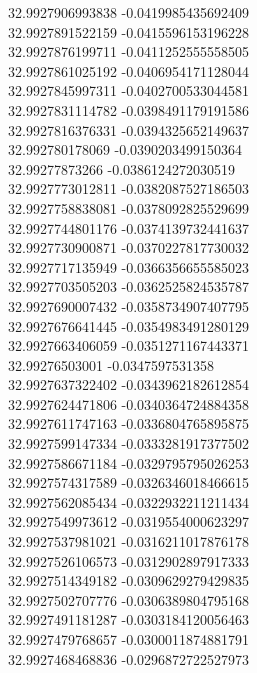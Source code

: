 {32.9927906993838	-0.0419985435692409\\
32.9927891522159	-0.0415596153196228\\
32.9927876199711	-0.0411252555558505\\
32.9927861025192	-0.0406954171128044\\
32.9927845997311	-0.0402700533044581\\
32.9927831114782	-0.0398491179191586\\
32.9927816376331	-0.0394325652149637\\
32.992780178069	-0.0390203499150364\\
32.99277873266	-0.0386124272030519\\
32.9927773012811	-0.0382087527186503\\
32.9927758838081	-0.0378092825529699\\
32.9927744801176	-0.0374139732441637\\
32.9927730900871	-0.0370227817730032\\
32.9927717135949	-0.0366356655585023\\
32.9927703505203	-0.0362525824535787\\
32.9927690007432	-0.0358734907407795\\
32.9927676641445	-0.0354983491280129\\
32.9927663406059	-0.0351271167443371\\
32.99276503001	-0.0347597531358\\
32.9927637322402	-0.0343962182612854\\
32.9927624471806	-0.0340364724884358\\
32.9927611747163	-0.0336804765895875\\
32.9927599147334	-0.0333281917377502\\
32.9927586671184	-0.0329795795026253\\
32.9927574317589	-0.0326346018466615\\
32.9927562085434	-0.0322932211211434\\
32.9927549973612	-0.0319554000623297\\
32.9927537981021	-0.0316211017876178\\
32.9927526106573	-0.0312902897917333\\
32.9927514349182	-0.0309629279429835\\
32.9927502707776	-0.0306389804795168\\
32.9927491181287	-0.0303184120056463\\
32.9927479768657	-0.0300011874881791\\
32.9927468468836	-0.0296872722527973\\
}
